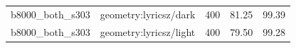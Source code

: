 \begin{longtable}{l>{\raggedright\arraybackslash}p{.42\linewidth}rrr}
b8000\_\allowbreak{}both\_\allowbreak{}s303 & %
geometry:lyricsz/dark & %
400 & %
81.25 & %
99.39 \\ %

b8000\_\allowbreak{}both\_\allowbreak{}s303 & %
geometry:lyricsz/light & %
400 & %
79.50 & %
99.28 \\ %


\end{longtable}

